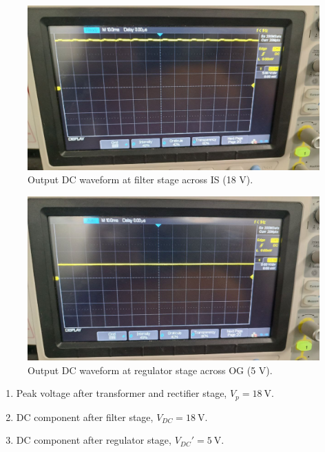 \documentclass[journal,12pt,twocolumn]{IEEEtran}
\begin{document}
\begin{figure}[!ht]
    \includegraphics[width=\columnwidth]{figs/figure3.jpg}
    \caption{Output DC waveform at filter stage across IS (18 V).}
    \label{fig:filter}
\end{figure}

\begin{figure}[!ht]
    \includegraphics[width=\columnwidth]{figs/figure4.jpg}
    \caption{Output DC waveform at regulator stage across OG (5 V).}
    \label{fig:regulator_dc}
\end{figure}


\begin{enumerate}
    \item Peak voltage after transformer and rectifier stage, 
        $V_p = \SI[parse-numbers=false]{18}{\V}$.
    \item DC component after filter stage, 
        $V_{DC} = \SI[parse-numbers=false]{18}{\V}$.
    \item DC component after regulator stage, $V_{DC}' = \SI{5}{\V}$.
\end{enumerate}
\end{document}
